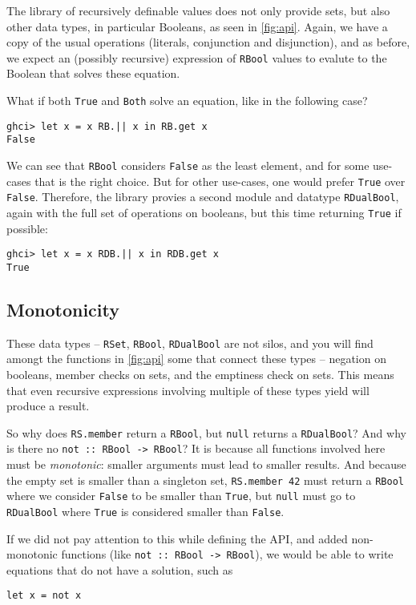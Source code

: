 \documentclass[manuscript,screen,acmsmall]{acmart}
\begin{document}
The library of recursively definable values does not only provide sets, but also other data types, in particular Booleans, as seen in \cref{fig:api}. Again, we have a copy of the usual operations (literals, conjunction and disjunction), and as before, we expect an (possibly recursive) expression of \verb|RBool| values to evalute to the Boolean that solves these equation.

What if both \verb|True| and \verb|Both| solve an equation, like in the following case?
\begin{verbatim}
ghci> let x = x RB.|| x in RB.get x
False
\end{verbatim}
We can see that \verb|RBool| considers \verb|False| as the least element, and for some use-cases that is the right choice. But for other use-cases, one would prefer \verb|True| over \verb|False|. Therefore, the library provies a second module and datatype \verb|RDualBool|, again with the full set of operations on booleans, but this time returning \verb|True| if possible:
\begin{verbatim}
ghci> let x = x RDB.|| x in RDB.get x
True
\end{verbatim}

\subsection{Monotonicity}\label{sec:monotonicity}

These data types -- \verb|RSet|, \verb|RBool|, \verb|RDualBool| are not silos, and you will find amongt the functions in \cref{fig:api} some that connect these types -- negation on booleans, member checks on sets, and the emptiness check on sets.
This means that even recursive expressions involving multiple of these types yield will produce a result.

So why does \verb|RS.member| return a \verb|RBool|, but \verb|null| returns a \verb|RDualBool|? And why is there no \verb|not :: RBool -> RBool|? It is because all functions involved here must be \emph{monotonic}: smaller arguments must lead to smaller results. And because the empty set is smaller than a singleton set, \verb|RS.member 42| must return a \verb|RBool| where we consider \verb|False| to be smaller than \verb|True|, but \verb|null| must go to \verb|RDualBool| where \verb|True| is considered smaller than \verb|False|.

If we did not pay attention to this while defining the API, and added non-monotonic functions (like \verb|not :: RBool -> RBool|), we would be able to write equations that do not have a solution, such as
\begin{verbatim}
let x = not x
\end{verbatim}
\end{document}
